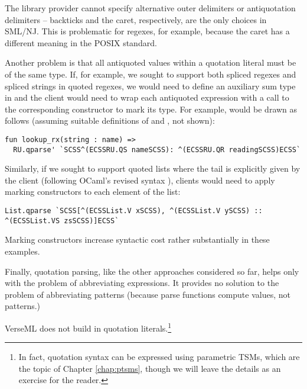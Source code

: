 The library provider cannot specify alternative outer delimiters or antiquotation delimiters -- backticks and the caret, respectively, are the only choices in SML/NJ. This is problematic for regexes, for example, because the caret has a different meaning in the POSIX standard.

Another problem is that all antiquoted values within a quotation literal must be of the same type. If, for example, we sought to support both spliced regexes and spliced strings in quoted regexes, we would need to define an auxiliary sum type in  
and the client would need to wrap each antiquoted expression with a call to the corresponding constructor to mark its type. 
For example,  would be drawn as follows (assuming suitable definitions of  and , not shown):
\begin{lstlisting}[numbers=none]
fun lookup_rx(string : name) =>
  RU.qparse' `SCSS^(ECSSRU.QS nameSCSS): ^(ECSSRU.QR readingSCSS)ECSS`
\end{lstlisting}
Similarly, if we sought to support quoted lists where the tail is explicitly given by the client (following OCaml's revised syntax \cite{ocaml-manual}), clients would need to apply marking constructors to each element of the list:
\begin{lstlisting}[numbers=none]
List.qparse `SCSS[^(ECSSList.V xSCSS), ^(ECSSList.V ySCSS) :: ^(ECSSList.VS zsSCSS)]ECSS`
\end{lstlisting}
Marking constructors increase syntactic cost rather substantially in these examples.

Finally, quotation parsing, like the other approaches considered so far, helps only with the problem of abbreviating expressions. It provides no solution to the problem of abbreviating patterns (because parse functions compute values, not patterns.)%

VerseML does not build in quotation literals.\footnote{In fact, quotation syntax can be expressed using parametric TSMs, which are the topic of Chapter \ref{chap:ptsms}, though we will leave the details as an exercise for the reader.}


